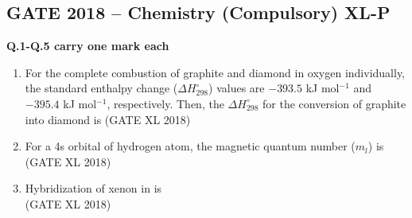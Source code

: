 \documentclass[14pt]{extarticle}
\begin{document}
\begin{flushleft}
\begin{center}
\section*{GATE 2018 – Chemistry (Compulsory) XL-P}
\end{center}
\textbf{Q.1-Q.5 carry one mark each}

\begin{enumerate}
\item For the complete combustion of graphite and diamond in oxygen individually, the standard enthalpy change ($\Delta H^\circ_{298}$) values are $-393.5$ kJ mol$^{-1}$ and $-395.4$ kJ mol$^{-1}$, respectively. Then, the $\Delta H^\circ_{298}$ for the conversion of graphite into diamond is \hfill (GATE XL 2018)\\
\begin{enumerate}[label=(\Alph*)]
\end{enumerate}
\item For a 4s orbital of hydrogen atom, the magnetic quantum number ($m_l$) is\\
\hfill (GATE XL 2018)
\begin{enumerate}[label=(\Alph*)]
\end{enumerate}

\item Hybridization of xenon in  is\\
\hfill (GATE XL 2018)\\
\begin{enumerate}[label=(\Alph*)]
\end{enumerate}


\end{enumerate}
\end{flushleft}
\end{document}
